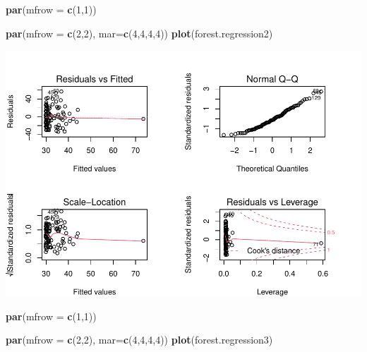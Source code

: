 \documentclass[
  12pt,
]{article}
\newenvironment{Shaded}{\begin{snugshade}}{\end{snugshade}}
\newcommand{\DataTypeTok}[1]{\textcolor[rgb]{0.13,0.29,0.53}{#1}}
\newcommand{\DecValTok}[1]{\textcolor[rgb]{0.00,0.00,0.81}{#1}}
\newcommand{\KeywordTok}[1]{\textcolor[rgb]{0.13,0.29,0.53}{\textbf{#1}}}
\newcommand{\NormalTok}[1]{#1}
\begin{document}
\begin{Shaded}
\begin{Highlighting}[]
\KeywordTok{par}\NormalTok{(}\DataTypeTok{mfrow =} \KeywordTok{c}\NormalTok{(}\DecValTok{1}\NormalTok{,}\DecValTok{1}\NormalTok{))}
\end{Highlighting}
\end{Shaded}

\begin{Shaded}
\begin{Highlighting}[]
\KeywordTok{par}\NormalTok{(}\DataTypeTok{mfrow =} \KeywordTok{c}\NormalTok{(}\DecValTok{2}\NormalTok{,}\DecValTok{2}\NormalTok{), }\DataTypeTok{mar=}\KeywordTok{c}\NormalTok{(}\DecValTok{4}\NormalTok{,}\DecValTok{4}\NormalTok{,}\DecValTok{4}\NormalTok{,}\DecValTok{4}\NormalTok{))}
\KeywordTok{plot}\NormalTok{(forest.regression2)}
\end{Highlighting}
\end{Shaded}

\includegraphics{Final_Project_Code_files/figure-latex/unnamed-chunk-5-1.pdf}

\begin{Shaded}
\begin{Highlighting}[]
\KeywordTok{par}\NormalTok{(}\DataTypeTok{mfrow =} \KeywordTok{c}\NormalTok{(}\DecValTok{1}\NormalTok{,}\DecValTok{1}\NormalTok{))}
\end{Highlighting}
\end{Shaded}

\begin{Shaded}
\begin{Highlighting}[]
\KeywordTok{par}\NormalTok{(}\DataTypeTok{mfrow =} \KeywordTok{c}\NormalTok{(}\DecValTok{2}\NormalTok{,}\DecValTok{2}\NormalTok{), }\DataTypeTok{mar=}\KeywordTok{c}\NormalTok{(}\DecValTok{4}\NormalTok{,}\DecValTok{4}\NormalTok{,}\DecValTok{4}\NormalTok{,}\DecValTok{4}\NormalTok{))}
\KeywordTok{plot}\NormalTok{(forest.regression3)}
\end{Highlighting}
\end{Shaded}
\end{document}
